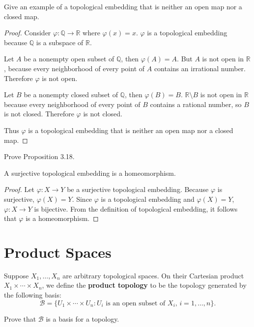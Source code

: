 \begin{exercise}{3.17}
	Give an example of a topological embedding that is neither an open map nor a closed map.
\end{exercise}

\begin{proof}
	Consider $\varphi: \mathbb{Q}\to \mathbb{R}$ where $\varphi(x) = x$. $\varphi$ is a topological embedding because $\mathbb{Q}$ is a subspace of $\mathbb{R}$.

	Let $A$ be a nonempty open subset of $\mathbb{Q}$, then $\varphi(A) = A$. But $A$ is not open in $\mathbb{R}$, because every neighborhood of every point of $A$ contains an irrational number. Therefore $\varphi$ is not open.

	Let $B$ be a nonempty closed subset of $\mathbb{Q}$, then $\varphi(B) = B$. $\mathbb{R}\setminus B$ is not open in $\mathbb{R}$ because every neighborhood of every point of $B$ contains a rational number, so $B$ is not closed. Therefore $\varphi$ is not closed.

	Thus $\varphi$ is a topological embedding that is neither an open map nor a closed map.
\end{proof}

\begin{exercise}{3.19}
	Prove Proposition 3.18.

	A surjective topological embedding is a homeomorphism.
\end{exercise}

\begin{proof}
	Let $\varphi: X\to Y$ be a surjective topological embedding. Because $\varphi$ is surjective, $\varphi(X) = Y$. Since $\varphi$ is a topological embedding and $\varphi(X) = Y$, $\varphi: X\to Y$ is bijective. From the definition of topological embedding, it follows that $\varphi$ is a homeomorphism.
\end{proof}

\section*{Product Spaces}

\begin{exercise}{3.25}
	Suppose $X_{1}, \ldots, X_{n}$ are arbitrary topological spaces. On their Cartesian product $X_{1}\times \cdots \times X_{n}$, we define the \textbf{product topology} to be the topology generated by the following basis:
	\[
		\mathscr{B} = \{ U_{1} \times \cdots \times U_{n}: \text{$U_{i}$ is an open subset of $X_{i}$, $i = 1,\ldots,n $}  \}.
	\]

	Prove that $\mathscr{B}$ is a basis for a topology.
\end{exercise}

